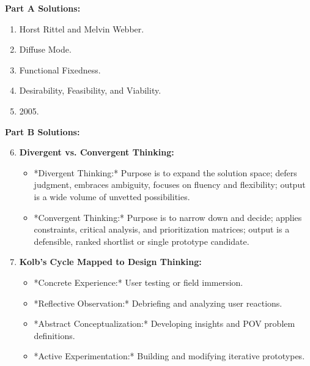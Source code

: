 \begin{solutionbox}
\textbf{Part A Solutions:}
\begin{enumerate}[leftmargin=1.2em, itemsep=2pt]
    \item Horst Rittel and Melvin Webber.
    \item Diffuse Mode.
    \item Functional Fixedness.
    \item Desirability, Feasibility, and Viability.
    \item 2005.
\end{enumerate}

\textbf{Part B Solutions:}
\begin{enumerate}[leftmargin=1.2em, itemsep=3pt]
    \setcounter{enumi}{5}
    \item \textbf{Divergent vs. Convergent Thinking:}
    \begin{itemize}
        \item *Divergent Thinking:* Purpose is to expand the solution space; defers judgment, embraces ambiguity, focuses on fluency and flexibility; output is a wide volume of unvetted possibilities.
        \item *Convergent Thinking:* Purpose is to narrow down and decide; applies constraints, critical analysis, and prioritization matrices; output is a defensible, ranked shortlist or single prototype candidate.
    \end{itemize}
    \item \textbf{Kolb's Cycle Mapped to Design Thinking:}
    \begin{itemize}
        \item *Concrete Experience:* User testing or field immersion.
        \item *Reflective Observation:* Debriefing and analyzing user reactions.
        \item *Abstract Conceptualization:* Developing insights and POV problem definitions.
        \item *Active Experimentation:* Building and modifying iterative prototypes.
    \end{itemize}
\end{enumerate}


\end{solutionbox}
